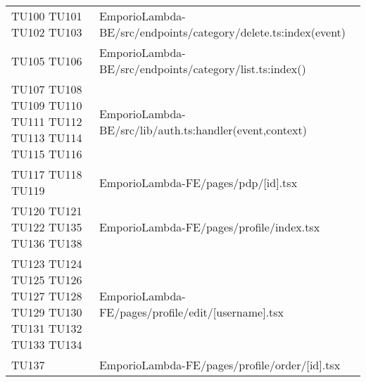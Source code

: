 {\begin{longtable}{C{2cm} C{12.8cm}}
TU100 \newline TU101 \newline TU102 \newline TU103 & EmporioLambda-BE/src/endpoints/category/delete.ts:index(event)\\

TU105 \newline TU106 & EmporioLambda-BE/src/endpoints/category/list.ts:index()\\

TU107 \newline TU108 \newline TU109 \newline TU110 \newline TU111 \newline TU112 \newline TU113 \newline TU114 \newline TU115 \newline TU116 & EmporioLambda-BE/src/lib/auth.ts:handler(event,context)\\

TU117 \newline TU118 \newline TU119 & EmporioLambda-FE/pages/pdp/[id].tsx\\

TU120 \newline TU121 \newline TU122 \newline TU135 \newline TU136 \newline TU138 & EmporioLambda-FE/pages/profile/index.tsx\\

TU123 \newline TU124 \newline TU125 \newline TU126 \newline TU127 \newline TU128 \newline TU129 \newline TU130 \newline TU131 \newline TU132 \newline TU133 \newline TU134  & EmporioLambda-FE/pages/profile/edit/[username].tsx\\

TU137 & EmporioLambda-FE/pages/profile/order/[id].tsx\\


\end{longtable}}
